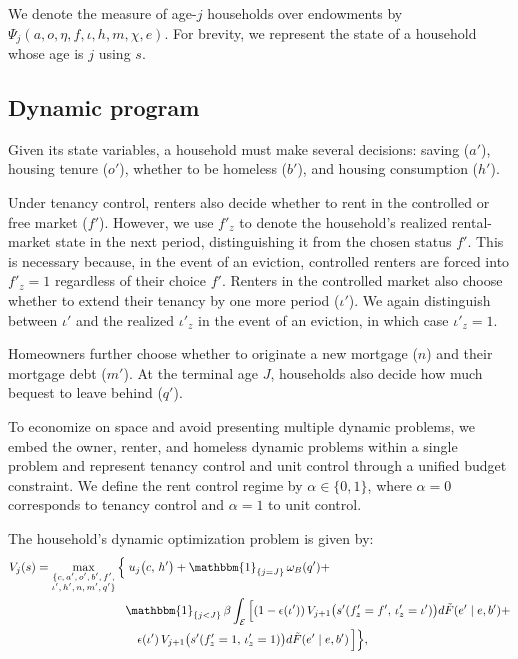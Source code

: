 \documentclass[parskip=full]{article}
\begin{document}
\noindent We denote the measure of age-$j$ households over endowments by $\Psi_{j}(a,o,\eta,f,\iota,h,m,\chi,e)$. For brevity, we represent the state of a household whose age is $j$ using $s$.

\subsection{Dynamic program}\label{subsection:household_optimization}
Given its state variables, a household must make several decisions: saving ($a'$), housing tenure ($o'$), whether to be homeless ($b'$), and housing consumption ($h'$). 

Under tenancy control, renters also decide whether to rent in the controlled or free market ($f'$). However, we use $f'_z$ to denote the household’s realized rental-market state in the next period, distinguishing it from the chosen status $f'$. This is necessary because, in the event of an eviction, controlled renters are forced into $f'_z = 1$ regardless of their choice $f'$. Renters in the controlled market also choose whether to extend their tenancy by one more period ($\iota'$). We again distinguish between $\iota'$ and the realized $\iota'_z$ in the event of an eviction, in which case $\iota'_z=1$.

Homeowners further choose whether to originate a new mortgage ($n$) and their mortgage debt ($m'$). At the terminal age $J$, households also decide how much bequest to leave behind ($q'$).

To economize on space and avoid presenting multiple dynamic problems, we embed the owner, renter, and homeless dynamic problems within a single problem and represent tenancy control and unit control through a unified budget constraint. We define the rent control regime by $\alpha \in \{0,1\}$, where $\alpha=0$ corresponds to tenancy control and $\alpha=1$ to unit control.

The household's dynamic optimization problem is given by:
\begin{equation}\label{eq:vf}
\begin{aligned}
V_{j}(s) 
= \max_{\substack{\{c,\, a',\, o',\, b',\, f', \\ \iota',\, h',\, n,\, m',\, q'\}}} \Big\{
& \; u_{j}\big( c,\, h' \big)
+ \mathbbm{1}_{\{ j = J \}}\, \omega_{B}(q')+ \\
& \mathbbm{1}_{\{ j < J \}}\, \beta 
\int_{\mathcal{E}} \Big[
(1 - \epsilon(\iota'))\, V_{j+1}\big( s'(f'_z=f',\, \iota'_z=\iota') \big)d\tilde{F}(e'\mid e, b') +\\ & \quad \epsilon(\iota')\, V_{j+1}\big( s'( f'_z = 1,\, \iota'_z = 1 ) \big)d\tilde{F}(e' \mid e, b') \,  \Big]
\Big\},
\end{aligned}
\end{equation}
\end{document}
